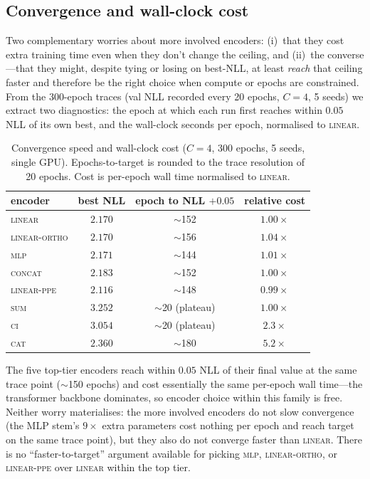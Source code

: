 \documentclass[11pt]{article}
\begin{document}
\subsection{Convergence and wall-clock cost}
\label{sec:results-convergence}

Two complementary worries about more involved encoders: (i)~that
they cost extra training time even when they don't change the
ceiling, and (ii)~the converse---that they might, despite tying or
losing on best-NLL, at least \emph{reach} that ceiling faster and
therefore be the right choice when compute or epochs are
constrained. From the 300-epoch traces (val NLL recorded every 20
epochs, $C{=}4$, 5 seeds) we extract two diagnostics: the epoch at
which each run first reaches within $0.05$ NLL of its own best, and
the wall-clock seconds per epoch, normalised to \textsc{linear}.

\begin{table}[h]
\centering
\caption{Convergence speed and wall-clock cost ($C{=}4$, 300 epochs,
5 seeds, single GPU). Epochs-to-target is rounded to the trace
resolution of 20 epochs. Cost is per-epoch wall time normalised to
\textsc{linear}.}
\label{tab:convergence}
\begin{tabular}{lccc}
\toprule
encoder & best NLL & epoch to NLL $+0.05$ & relative cost \\
\midrule
\textsc{linear}     & $2.170$ & $\sim$152 & $1.00\times$ \\
\textsc{linear-ortho}  & $2.170$ & $\sim$156 & $1.04\times$ \\
\textsc{mlp}        & $2.171$ & $\sim$144 & $1.01\times$ \\
\textsc{concat}     & $2.183$ & $\sim$152 & $1.00\times$ \\
\textsc{linear-ppe} & $2.116$ & $\sim$148 & $0.99\times$ \\
\midrule
\textsc{sum}        & $3.252$ & $\sim$20 (plateau) & $1.00\times$ \\
\textsc{ci}         & $3.054$ & $\sim$20 (plateau) & $2.3\times$ \\
\textsc{cat}        & $2.360$ & $\sim$180 & $5.2\times$ \\
\bottomrule
\end{tabular}
\end{table}

The five top-tier encoders reach within $0.05$ NLL of their final
value at the same trace point ($\sim$150 epochs) and cost
essentially the same per-epoch wall time---the transformer backbone
dominates, so encoder choice within this family is free. Neither
worry materialises: the more involved encoders do not slow
convergence (the MLP stem's $9{\times}$ extra parameters cost
nothing per epoch and reach target on the same trace point), but
they also do not converge faster than \textsc{linear}. There is no
``faster-to-target'' argument available for picking
\textsc{mlp}, \textsc{linear-ortho}, or \textsc{linear-ppe} over
\textsc{linear} within the top tier.
\end{document}
